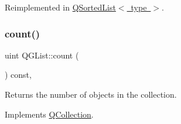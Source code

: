 Reimplemented in \mbox{\hyperlink{class_q_sorted_list_ac668d73e64708886064106eebecf33ae}{Q\+Sorted\+List$<$ type $>$}}.

\mbox{\label{class_q_g_list_af765260057e85e575adff7fd9f25d062}} 
\subsubsection{\texorpdfstring{count()}{count()}}
{\footnotesize\ttfamily uint Q\+G\+List\+::count (\begin{DoxyParamCaption}{ }\end{DoxyParamCaption}) const\hspace{0.3cm}{\ttfamily [inline]}, {\ttfamily [virtual]}}

Returns the number of objects in the collection. 

Implements \mbox{\hyperlink{class_q_collection_a6441adbfb3ffb6f55ed834c0c0bcc6cb}{Q\+Collection}}.



